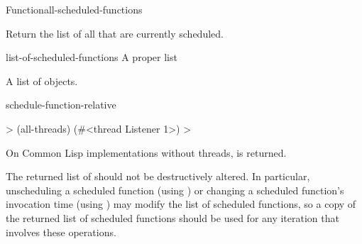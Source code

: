 \documentclass[10pt,twoside,english,pdftex]{article}
\begin{document}
\begin{functiondoc}{Function}{all-scheduled-functions}{\noargs{} 
    }
%
%

\fnsyntax

\fnpurpose Return the list of all  that are
currently scheduled.

\fnpackage {}

\fnmodule {}

\fnargs
\begin{args}{list-of-scheduled-functions}
 A proper list
\end{args}

\fnreturns A list of  objects. 

\begin{alsos}{schedule-function-relative}
\end{alsos}

\fnexample
%
\W\supp
\begin{example}
  > (all-threads)
  (#<thread Listener 1>)
  >
\end{example}

\fnnotes On Common Lisp implementations without threads, \nil{} is returned.

%
%
%
The returned list of  should not be destructively
altered.  In particular, unscheduling a scheduled function (using
) or changing a scheduled
function's invocation time (using )
may modify the list of scheduled functions, so a copy of the returned list of
scheduled functions should be used for any iteration that involves these
operations.

\end{functiondoc}

\end{document}
